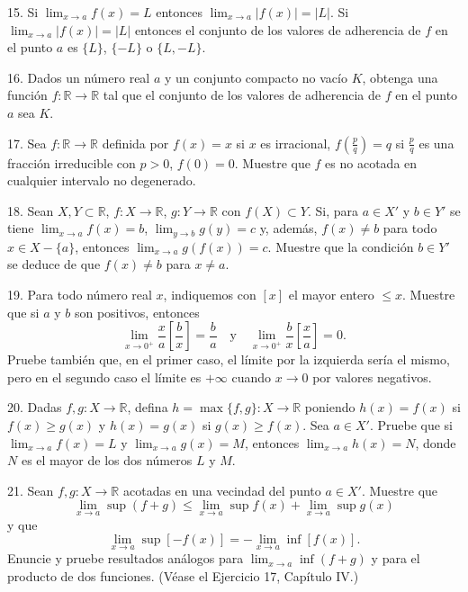 \documentclass[12pt,oneside]{book}
\begin{document}
15. Si \(\lim_{x \to a} f(x) = L\) entonces \(\lim_{x \to a} |f(x)| = |L|\). Si \(\lim_{x \to a} |f(x)| = |L|\) entonces el conjunto de los valores de adherencia de \(f\) en el punto \(a\) es \(\{L\}\), \(\{-L\}\) o \(\{L, -L\}\).

16. Dados un número real \(a\) y un conjunto compacto no vacío \(K\), obtenga una función \(f: \mathbb{R} \to \mathbb{R}\) tal que el conjunto de los valores de adherencia de \(f\) en el punto \(a\) sea \(K\).

17. Sea \(f: \mathbb{R} \to \mathbb{R}\) definida por \(f(x) = x\) si \(x\) es irracional, \(f\left(\frac{p}{q}\right) = q\) si \(\frac{p}{q}\) es una fracción irreducible con \(p > 0\), \(f(0) = 0\). Muestre que \(f\) es no acotada en cualquier intervalo no degenerado.

18. Sean \(X, Y \subset \mathbb{R}\), \(f: X \to \mathbb{R}\), \(g: Y \to \mathbb{R}\) con \(f(X) \subset Y\). Si, para \(a \in X'\) y \(b \in Y'\) se tiene \(\lim_{x \to a} f(x) = b\), \(\lim_{y \to b} g(y) = c\) y, además, \(f(x) \neq b\) para todo \(x \in X - \{a\}\), entonces \(\lim_{x \to a} g(f(x)) = c\). Muestre que la condición \( b \in Y' \) se deduce de que \( f(x) \neq b \) para \( x \neq a \).

19. Para todo número real \( x \), indiquemos con \([x]\) el mayor entero \(\leq x\). Muestre que si \( a \) y \( b \) son positivos, entonces
\[
\lim_{x \to 0^+} \frac{x}{a} \left[ \frac{b}{x} \right] = \frac{b}{a} \quad \text{y} \quad \lim_{x \to 0^+} \frac{b}{x} \left[ \frac{x}{a} \right] = 0.
\]
Pruebe también que, en el primer caso, el límite por la izquierda sería el mismo, pero en el segundo caso el límite es \( +\infty \) cuando \( x \to 0 \) por valores negativos.

20. Dadas \( f, g: X \to \mathbb{R} \), defina \( h = \max\{f, g\}: X \to \mathbb{R} \) poniendo \( h(x) = f(x) \) si \( f(x) \geq g(x) \) y \( h(x) = g(x) \) si \( g(x) \geq f(x) \). Sea \( a \in X' \). Pruebe que si \( \lim_{x \to a} f(x) = L \) y \( \lim_{x \to a} g(x) = M \), entonces \( \lim_{x \to a} h(x) = N \), donde \( N \) es el mayor de los dos números \( L \) y \( M \).

21. Sean \( f, g: X \to \mathbb{R} \) acotadas en una vecindad del punto \( a \in X' \). Muestre que
\[
\lim_{x \to a} \sup (f + g) \leq \lim_{x \to a} \sup f(x) + \lim_{x \to a} \sup g(x)
\]
y que
\[
\lim_{x \to a} \sup [-f(x)] = -\lim_{x \to a} \inf [f(x)].
\]
Enuncie y pruebe resultados análogos para \( \lim_{x \to a} \inf (f + g) \) y para el producto de dos funciones. (Véase el Ejercicio 17, Capítulo IV.)
\end{document}
